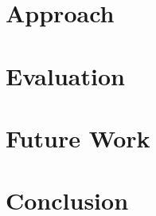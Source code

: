 \documentclass[a4paper, twoside]{IEEEtran}
\begin{document}
\section{Approach}
\label{sec:approach}


\section{Evaluation}
\label{sec:evaluation}


\section{Future Work}
\label{sec:future_work}


\section{Conclusion}
\label{sec:conclusion}




\end{document}
